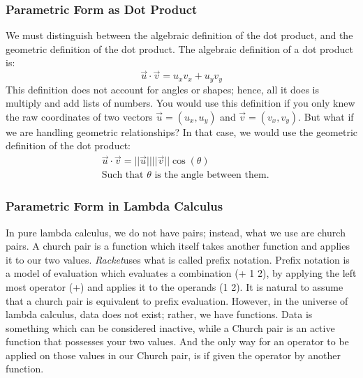 \documentclass[12pt, letterpaper]{article}
\newcommand{\iRac}{\textit{Racket}}
\begin{document}
	\subsubsection{Parametric Form as Dot Product}
	We must distinguish between the algebraic definition of the dot product, and the geometric definition of the dot product.
	The algebraic definition of a dot product is:
	\begin{equation*}
		\vec{u} \cdot \vec{v} = u_x v_x + u_y v_y
	\end{equation*}
	This definition does not account for angles or shapes; hence, all it does is multiply and add lists of numbers. You would use this definition if you only knew the raw coordinates of two vectors \(\vec{u} = (u_x, u_y)\) and \(\vec{v} = (v_x, v_y)\). But what if we are handling geometric relationships? In that case, we would use the geometric definition of the dot product:
	\begin{equation*}
		\begin{split}
		&\vec{u} \cdot \vec{v} = ||\vec{u}|| ||\vec{v}|| \cos(\theta) \\
		&\text{Such that } \theta \text{ is the angle between them.}
		\end{split}
	\end{equation*}
	
	\subsubsection*{Parametric Form in Lambda Calculus}
	In pure lambda calculus, we do not have pairs; instead, what we use are church pairs. A church pair is a function which itself takes another function and applies it to our two values. \iRac uses what is called prefix notation. Prefix notation is a model of evaluation which evaluates a combination (+ 1 2), by applying the left most operator (+) and applies it to the operands (1 2). It is natural to assume that a church pair is equivalent to prefix evaluation. However, in the universe of lambda calculus, data does not exist; rather, we have functions.
	Data is something which can be considered inactive, while a Church pair is an active function that possesses your two values. And the only way for an operator to be applied on those values in our Church pair, is if given the operator by another function.
	
\end{document}
